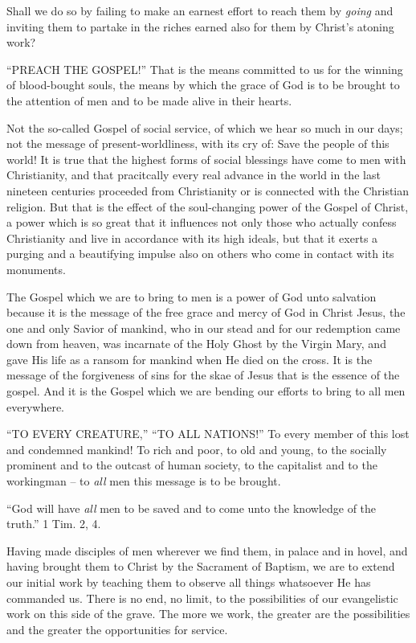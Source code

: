 \documentclass[
]{book}
\begin{document}
Shall we do so by failing to make an earnest effort to reach them by \emph{going} and inviting them to partake in the riches earned also for them by Christ's atoning work?

``PREACH THE GOSPEL!'' That is the means committed to us for the winning of blood-bought souls, the means by which the grace of God is to be brought to the attention of men and to be made alive in their hearts.

Not the so-called Gospel of social service, of which we hear so much in our days; not the message of present-worldliness, with its cry of: Save the people of this world! It is true that the highest forms of social blessings have come to men with Christianity, and that pracitcally every real advance in the world in the last nineteen centuries proceeded from Christianity or is connected with the Christian religion. But that is the effect of the soul-changing power of the Gospel of Christ, a power which is so great that it influences not only those who actually confess Christianity and live in accordance with its high ideals, but that it exerts a purging and a beautifying impulse also on others who come in contact with its monuments.

The Gospel which we are to bring to men is a power of God unto salvation because it is the message of the free grace and mercy of God in Christ Jesus, the one and only Savior of mankind, who in our stead and for our redemption came down from heaven, was incarnate of the Holy Ghost by the Virgin Mary, and gave His life as a ransom for mankind when He died on the cross. It is the message of the forgiveness of sins for the skae of Jesus that is the essence of the gospel. And it is the Gospel which we are bending our efforts to bring to all men everywhere.

``TO EVERY CREATURE,'' ``TO ALL NATIONS!'' To every member of this lost and condemned mankind! To rich and poor, to old and young, to the socially prominent and to the outcast of human society, to the capitalist and to the workingman -- to \emph{all} men this message is to be brought.

``God will have \emph{all} men to be saved and to come unto the knowledge of the truth.'' 1 Tim. 2, 4.

Having made disciples of men wherever we find them, in palace and in hovel, and having brought them to Christ by the Sacrament of Baptism, we are to extend our initial work by teaching them to observe all things whatsoever He has commanded us. There is no end, no limit, to the possibilities of our evangelistic work on this side of the grave. The more we work, the greater are the possibilities and the greater the opportunities for service.
\end{document}
